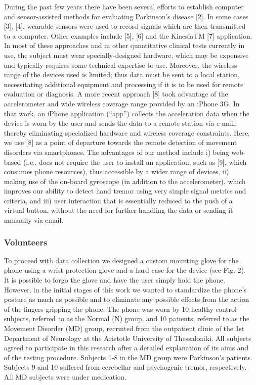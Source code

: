 During the past few years there have been several efforts to establish computer and sensor-assisted methods for evaluating Parkinson’s disease [2]. In some cases [3], [4], wearable sensors were used to record signals which are then transmitted to a computer. Other examples include [5], [6] and the KinesiaTM [7] application. In most of these approaches and in other quantitative clinical tests currently in use, the subject must wear specially-designed hardware, which may be expensive and typically requires some technical expertise to use. Moreover, the wireless range of the devices used is limited; thus data must be sent to a local station, necessitating additional equipment and processing if it is to be used for remote evaluation or diagnosis. 
A more recent approach [8] took advantage of the accelerometer and wide wireless coverage range provided by an iPhone 3G. In that work, an iPhone application (“app”) collects the acceleration data when the device is worn by the user and sends the data to a remote station via e-mail, thereby eliminating specialized hardware and wireless  
coverage constraints. Here, we use [8] as a point of departure towards the remote detection of movement disorders via smartphones. The advantages of our method include i) being web-based (i.e., does not require the user to install an application, such as [9], which consumes phone resources), thus accessible by a wider range of devices, ii) making use of the on-board gyroscope (in addition to the accelerometer), which improves our ability to detect hand tremor using very simple signal metrics and criteria, and iii) user interaction that is essentially reduced to the push of a virtual button, without the need for further handling the data or sending it manually via email.

\subsubsection{Volunteers}
\label{subsubsec:smartCT1Volunteers}
To proceed with data collection we designed a custom mounting glove for the phone using a wrist protection glove and a hard case for the device (see Fig. 2). It is possible to forgo the glove and have the user simply hold the phone. However, in the initial stages of this work we wanted to standardize the phone’s posture as much as possible and to eliminate any possible effects from the action of the fingers gripping the phone. The phone was worn by 10 healthy control subjects, referred to as the Normal (N) group, and 10 patients, referred to as the Movement Disorder (MD) group, recruited from the outpatient clinic of the 1st Department of Neurology at the Aristotle University of Thessaloniki. All subjects agreed to participate in this research after a detailed explanation of its aims and of the testing procedure. Subjects 1-8 in the MD group were Parkinson’s patients. Subjects 9 and 10 suffered from cerebellar and psychogenic tremor, respectively. All MD subjects were under medication.  

